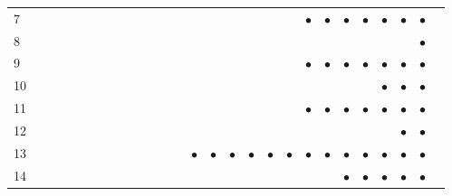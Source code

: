 \documentclass[text.tex]{subfiles}
\begin{document}
\begin{table}
{\begin{tabular}{l|cccccccccccccccccccccccccc}
7   &           &           &           &           &           &           &           &           &           &           &           &           &           &           &           &           &           &           & $\bullet$ & $\bullet$ & $\bullet$ & $\bullet$ & $\bullet$ & $\bullet$ & $\bullet$ \\
8   &           &           &           &           &           &           &           &           &           &           &           &           &           &           &           &           &           &           &           &           &           &           &           &           & $\bullet$ \\
9   &           &           &           &           &           &           &           &           &           &           &           &           &           &           &           &           &           &           & $\bullet$ & $\bullet$ & $\bullet$ & $\bullet$ & $\bullet$ & $\bullet$ & $\bullet$ \\
10  &           &           &           &           &           &           &           &           &           &           &           &           &           &           &           &           &           &           &           &           &           &           & $\bullet$ & $\bullet$ & $\bullet$ \\
11  &           &           &           &           &           &           &           &           &           &           &           &           &           &           &           &           &           &           & $\bullet$ & $\bullet$ & $\bullet$ & $\bullet$ & $\bullet$ & $\bullet$ & $\bullet$ \\
12  &           &           &           &           &           &           &           &           &           &           &           &           &           &           &           &           &           &           &           &           &           &           &           & $\bullet$ & $\bullet$ \\
13  &           &           &           &           &           &           &           &           &           &           &           &           & $\bullet$ & $\bullet$ & $\bullet$ & $\bullet$ & $\bullet$ & $\bullet$ & $\bullet$ & $\bullet$ & $\bullet$ & $\bullet$ & $\bullet$ & $\bullet$ & $\bullet$ \\
14  &           &           &           &           &           &           &           &           &           &           &           &           &           &           &           &           &           &           &           &           & $\bullet$ & $\bullet$ & $\bullet$ & $\bullet$ & $\bullet$ \\

\end{tabular}}
\end{table}
\end{document}
